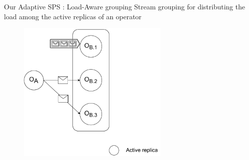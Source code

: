\begin{frame}{Our Adaptive SPS : Load-Aware grouping}
	Stream grouping for distributing the load among the active replicas of an operator
	\begin{figure}
		\includegraphics[width=0.65\textwidth]{images/problems/LoadGrouping2.pdf}
	\end{figure}
\end{frame}





